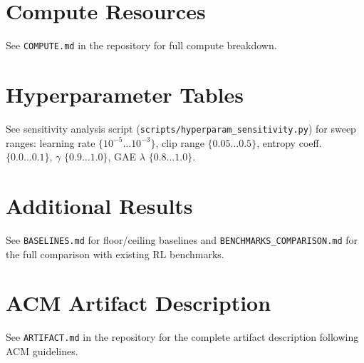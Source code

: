 \documentclass[manuscript,review,anonymous]{acmart}
\begin{document}
\appendix

\section{Compute Resources}
\label{app:compute}

See \texttt{COMPUTE.md} in the repository for full compute breakdown.

\section{Hyperparameter Tables}
\label{app:hyperparams}

See sensitivity analysis script (\texttt{scripts/hyperparam\_sensitivity.py})
for sweep ranges: learning rate $\{10^{-5}\ldots10^{-3}\}$,
clip range $\{0.05\ldots0.5\}$, entropy coeff. $\{0.0\ldots0.1\}$,
$\gamma$ $\{0.9\ldots1.0\}$, GAE $\lambda$ $\{0.8\ldots1.0\}$.

\section{Additional Results}
\label{app:results}

See \texttt{BASELINES.md} for floor/ceiling baselines and
\texttt{BENCHMARKS\_COMPARISON.md} for the full comparison with existing RL benchmarks.

\section{ACM Artifact Description}
\label{app:artifact}

See \texttt{ARTIFACT.md} in the repository for the complete artifact
description following ACM guidelines.
\end{document}
